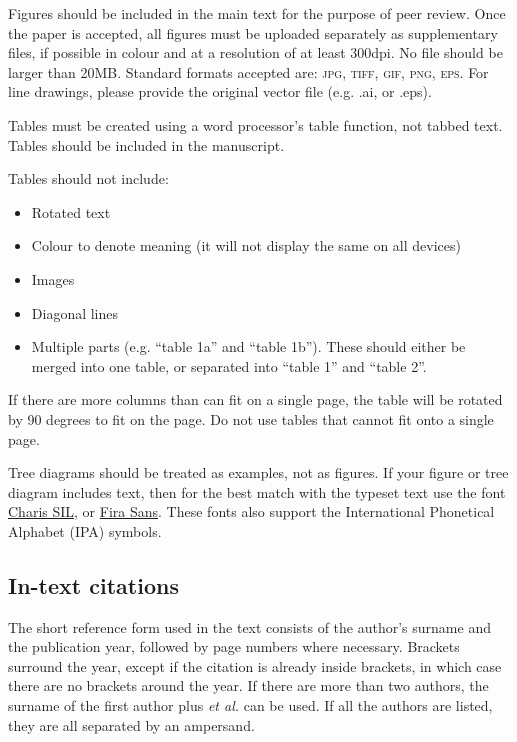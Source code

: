 \documentclass[charis,linguex,biblatex]{glossa}
\begin{document}
Figures should be included in the main text for the purpose of peer review. Once the paper is accepted, all figures must be uploaded separately as supplementary files, if possible in colour and at a resolution of at least 300dpi. No file should be larger than 20MB. Standard formats accepted are: \textsc{jpg, tiff, gif, png, eps}. For line drawings, please provide the original vector file (e.g. .ai, or .eps).

Tables must be created using a word processor's table function, not tabbed text. Tables should be included in the manuscript. 

Tables should not include:

\begin{itemize}
\item Rotated text
\item Colour to denote meaning (it will not display the same on all devices)
\item Images
\item Diagonal lines
\item Multiple parts (e.g. ``table 1a'' and ``table 1b''). These should either be merged into one table, or separated into ``table 1'' and ``table 2''.
\end{itemize}
If there are more columns than can fit on a single page, the table will be rotated by 90 degrees to fit on the page. Do not use tables that cannot fit onto a single page.

Tree diagrams should be treated as examples, not as figures. If your figure or tree diagram includes text, then for the best match with the typeset text use the font \href{https://software.sil.org/charis/download/}{Charis SIL}, or \href{https://www.fontsquirrel.com/fonts/fira-sans}{Fira Sans}. These fonts also support the International Phonetical Alphabet (IPA) symbols.


\subsection{In-text citations}

The short reference form used in the text consists of the author’s surname and the publication year, followed by page numbers where necessary. Brackets surround the year, except if the citation is already inside brackets, in which case there are no brackets around the year. If there are more than two authors, the surname of the first author plus \textit{et al.} can be used. If all the authors are listed, they are all separated by an ampersand.
\end{document}
